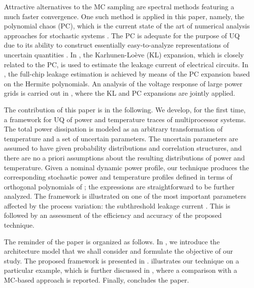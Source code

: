 Attractive alternatives to the MC sampling are spectral methods \cite{xiu2010, maitre2010, ghanem1991} featuring a much faster convergence. One such method is applied in this paper, namely, the polynomial chaos (PC), which is the current state of the art of numerical analysis approaches for stochastic systems \cite{xiu2010}. The PC is adequate for the purpose of UQ due to its ability to construct essentially easy-to-analyze representations of uncertain quantities \cite{eldred2009}. In \cite{bhardwaj2006}, the Karhunen-Lo\`{e}ve (KL) expansion, which is closely related to the PC, is used to estimate the leakage current of electrical circuits. In \cite{shen2009}, the full-chip leakage estimation is achieved by means of the PC expansion based on the Hermite polynomials. An analysis of the voltage response of large power grids is carried out in \cite{ghanta2006}, where the KL and PC expansions are jointly applied.

The contribution of this paper is in the following. We develop, for the first time, a framework for UQ of power and temperature traces of multiprocessor systems. The total power dissipation is modeled as an arbitrary transformation of temperature and a set of uncertain parameters. The uncertain parameters are assumed to have given probability distributions and correlation structures, and there are no a priori assumptions about the resulting distributions of power and temperature. Given a nominal dynamic power profile, our technique produces the corresponding stochastic power and temperature profiles defined in terms of orthogonal polynomials of \rvs; the expressions are straightforward to be further analyzed. The framework is illustrated on one of the most important parameters affected by the process variation: the subthreshold leakage current \cite{srivastava2010}. This is followed by an assessment of the efficiency and accuracy of the proposed technique.

The reminder of the paper is organized as follows. In , we introduce the architecture model that we shall consider and formulate the objective of our study. The proposed framework is presented in .  illustrates our technique on a particular example, which is further discussed in , where a comparison with a MC-based approach is reported. Finally,  concludes the paper.
